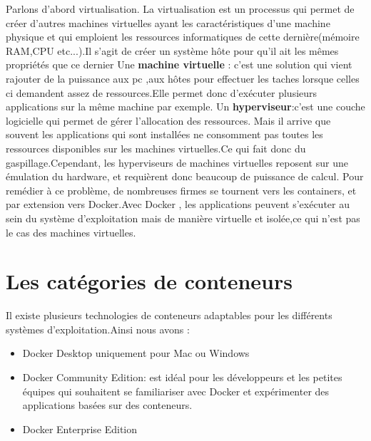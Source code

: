 Parlons d’abord virtualisation.
La virtualisation est un processus qui permet de créer d'autres machines virtuelles ayant les caractéristiques d'une machine physique et qui emploient les ressources informatiques de cette dernière(mémoire RAM,CPU etc...).Il s’agit de créer un système hôte pour qu’il ait les mêmes propriétés que ce dernier
Une \textbf{machine virtuelle} : c’est une solution qui vient rajouter de la puissance aux pc ,aux hôtes pour effectuer les taches lorsque celles ci demandent assez de ressources.Elle permet donc d'exécuter plusieurs applications sur la même machine par exemple.
Un \textbf{hyperviseur}:c'est une couche logicielle qui permet de gérer l'allocation des ressources.
Mais il arrive que souvent les applications qui sont installées  ne consomment pas toutes les ressources disponibles sur les machines virtuelles.Ce qui fait donc du gaspillage.Cependant, les hyperviseurs de machines virtuelles reposent sur une émulation du hardware, et requièrent donc beaucoup de puissance de calcul. Pour remédier à ce problème, de nombreuses firmes se tournent vers les containers, et par extension vers Docker.Avec Docker , les applications peuvent s'exécuter au sein du système d'exploitation mais de manière virtuelle et isolée,ce qui n'est pas le cas des machines virtuelles.
\section*{Les catégories de conteneurs} 
Il existe plusieurs technologies de conteneurs adaptables pour les différents systèmes d'exploitation.Ainsi nous avons :
\begin{itemize}
	\item Docker Desktop uniquement pour Mac ou Windows
	\item Docker Community Edition: est idéal pour les développeurs et les petites équipes qui souhaitent se familiariser avec Docker et expérimenter des applications basées sur des conteneurs.
	\item  Docker Enterprise Edition
\end{itemize}
